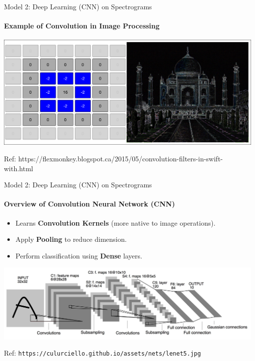 \documentclass{beamer}
\begin{document}
\begin{frame}{Model 2: Deep Learning (CNN) on Spectrograms}
  \framesubtitle{Example of Convolution in Image Processing}

  \begin{center}
  \includegraphics[scale=0.26]{img/mahal_conv.png}

  Ref: https://flexmonkey.blogspot.ca/2015/05/convolution-filters-in-swift-with.html
  \end{center}
\end{frame}



\begin{frame}{Model 2: Deep Learning (CNN) on Spectrograms}
  \framesubtitle{Overview of Convolution Neural Network (CNN)}

  \begin{block}{}
    \begin{itemize}
    \item Learns \textbf{Convolution Kernels} (more native to image operations).
    \item Apply \textbf{Pooling} to reduce dimension.
    \item Perform classification using \textbf{Dense} layers.
    \end{itemize}
  \end{block}
  
  \begin{center}
    \includegraphics[scale=0.15]{img/cnn_gen.jpg}

    Ref: \texttt{https://culurciello.github.io/assets/nets/lenet5.jpg}
  \end{center}

\end{frame}
\end{document}
